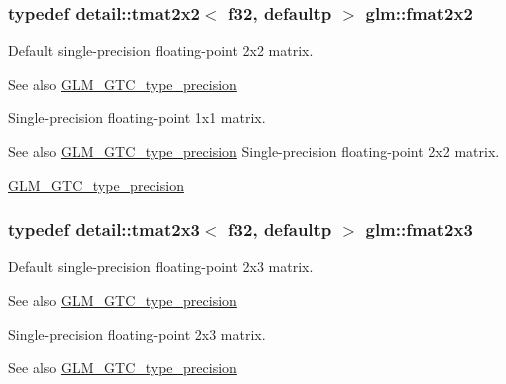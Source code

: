 \subsubsection[{\texorpdfstring{fmat2x2}{fmat2x2}}]{\setlength{\rightskip}{0pt plus 5cm}typedef detail\+::tmat2x2$<$ f32, defaultp $>$ {\bf glm\+::fmat2x2}}\hypertarget{group__gtc__type__precision_gada7823c23ae249dccaecb5a016c667f4}{}\label{group__gtc__type__precision_gada7823c23ae249dccaecb5a016c667f4}
Default single-\/precision floating-\/point 2x2 matrix. \begin{DoxySeeAlso}{See also}
\hyperlink{group__gtc__type__precision}{G\+L\+M\+\_\+\+G\+T\+C\+\_\+type\+\_\+precision}
\end{DoxySeeAlso}
Single-\/precision floating-\/point 1x1 matrix. \begin{DoxySeeAlso}{See also}
\hyperlink{group__gtc__type__precision}{G\+L\+M\+\_\+\+G\+T\+C\+\_\+type\+\_\+precision} Single-\/precision floating-\/point 2x2 matrix. 

\hyperlink{group__gtc__type__precision}{G\+L\+M\+\_\+\+G\+T\+C\+\_\+type\+\_\+precision} 
\end{DoxySeeAlso}
\subsubsection[{\texorpdfstring{fmat2x3}{fmat2x3}}]{\setlength{\rightskip}{0pt plus 5cm}typedef detail\+::tmat2x3$<$ f32, defaultp $>$ {\bf glm\+::fmat2x3}}\hypertarget{group__gtc__type__precision_ga087d875cd4e384f101a28a4caf8ccd94}{}\label{group__gtc__type__precision_ga087d875cd4e384f101a28a4caf8ccd94}
Default single-\/precision floating-\/point 2x3 matrix. \begin{DoxySeeAlso}{See also}
\hyperlink{group__gtc__type__precision}{G\+L\+M\+\_\+\+G\+T\+C\+\_\+type\+\_\+precision}
\end{DoxySeeAlso}
Single-\/precision floating-\/point 2x3 matrix. \begin{DoxySeeAlso}{See also}
\hyperlink{group__gtc__type__precision}{G\+L\+M\+\_\+\+G\+T\+C\+\_\+type\+\_\+precision} 
\end{DoxySeeAlso}
